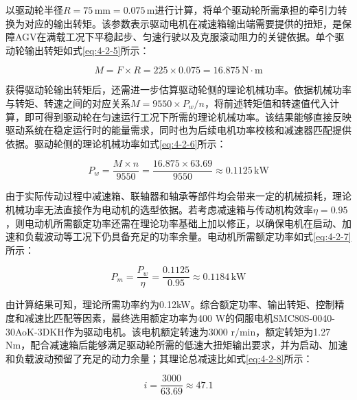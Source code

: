 {{{{        以驱动轮半径$R=75\,\mathrm{mm}=0.075\,\mathrm{m}$进行计算，将单个驱动轮所需承担的牵引力转换为对应的输出转矩。该参数表示驱动电机在减速箱输出端需要提供的扭矩，是保障AGV在满载工况下平稳起步、匀速行驶以及克服滚动阻力的关键依据。单个驱动轮输出转矩如式\eqref{eq:4-2-5}所示：

        \begin{equation}
        M = F\times R = 225\times0.075 = 16.875\,\mathrm{N\cdot m}
        \label{eq:4-2-5}
        \end{equation}

        获得驱动轮输出转矩后，还需进一步估算驱动轮侧的理论机械功率。依据机械功率与转矩、转速之间的对应关系$M=9550\times P_w/n$，将前述转矩值和转速值代入计算，即可得到驱动轮在匀速运行工况下所需的理论机械功率。该结果能够直接反映驱动系统在稳定运行时的能量需求，同时也为后续电机功率校核和减速器匹配提供依据。驱动轮侧的理论机械功率如式\eqref{eq:4-2-6}所示：

        \begin{equation}
        P_w = \frac{M\times n}{9550} = \frac{16.875\times63.69}{9550} \approx 0.1125\,\mathrm{kW}
        \label{eq:4-2-6}
        \end{equation}

        由于实际传动过程中减速箱、联轴器和轴承等部件均会带来一定的机械损耗，理论机械功率无法直接作为电动机的选型依据。若考虑减速箱与传动机构效率$\eta=0.95$，则电动机所需额定功率还需在理论功率基础上加以修正，以确保电机在启动、加速和负载波动等工况下仍具备充足的功率余量。电动机所需额定功率如式\eqref{eq:4-2-7}所示：

        \begin{equation}
        P_m = \frac{P_w}{\eta} = \frac{0.1125}{0.95} \approx 0.1184\,\mathrm{kW}
        \label{eq:4-2-7}
        \end{equation}

        由计算结果可知，理论所需功率约为0.12kW。综合额定功率、输出转矩、控制精度和减速比匹配等因素，最终选用额定功率为400 W的伺服电机SMC80S-0040-30AoK-3DKH作为驱动电机。该电机额定转速为3000 r/min，额定转矩为1.27 N\cdot m，配合减速箱后能够满足驱动轮所需的低速大扭矩输出要求，并为启动、加速和负载波动预留了充足的动力余量；其理论总减速比如式\eqref{eq:4-2-8}所示：

        \begin{equation}
        i = \frac{3000}{63.69} \approx 47.1
        \label{eq:4-2-8}
        \end{equation}

}}}}
